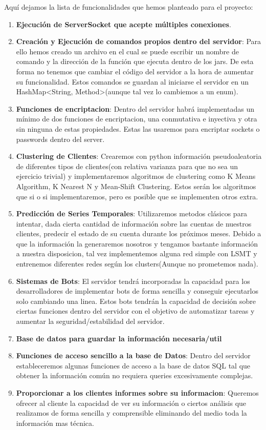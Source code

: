 \documentclass{article}
\theoremstyle{definition}
\begin{document}
Aquí dejamos la lista de funcionalidades que hemos planteado para el proyecto:
\begin{enumerate}
\item \textbf{Ejecución de ServerSocket que acepte múltiples conexiones}.
\item \textbf{Creación y Ejecución de comandos propios dentro del servidor}: Para ello hemos creado un archivo en el cual se puede escribir un nombre de comando y la dirección de la función que ejecuta dentro de los jars. De esta forma no tenemos que cambiar el código del servidor a la hora de aumentar su funcionalidad. Estos comandos se guardan al iniciarse el servidor en un HashMap<String, Method>(aunque tal vez lo cambiemos a un enum).
\item \textbf{Funciones de encriptacion}: Dentro del servidor habrá implementadas un mínimo de dos funciones de encriptacion, una conmutativa e inyectiva y otra sin ninguna de estas propiedades. Estas las usaremos para encriptar sockets o passwords dentro del server.
\item \textbf{Clustering de Clientes}: Crearemos con python información pseudoaleatoria de diferentes tipos de clientes(con relativa varianza para que no sea un ejercicio trivial) y implementaremos algoritmos de clustering como K Means Algorithm, K Nearest N y Mean-Shift Clustering. Estos serán los algoritmos que si o si implementaremos, pero es posible que se implementen otros extra. 
\item \textbf{Predicción de Series Temporales}: Utilizaremos metodos clásicos para intentar, dada cierta cantidad de información sobre las cuentas de nuestros clientes, predecir el estado de su cuenta durante los próximos meses.  Debido a que la información la generaremos nosotros y tengamos bastante información a nuestra disposicion, tal vez implementemos alguna red simple con LSMT y entrenemos diferentes redes según los clusters(Aunque no prometemos nada).
\item \textbf{Sistemas de Bots}: El servidor tendrá incorporadas la capacidad para los desarrolladores de implementar bots de forma sencilla y conseguir ejecutarlos solo cambiando una linea. Estos bots tendrán la capacidad de decisión sobre ciertas funciones dentro del servidor con el objetivo de automatizar tareas y aumentar la seguridad/estabilidad del servidor.
\item \textbf{Base de datos para guardar la información necesaria/util}
\item \textbf{Funciones de acceso sencillo a la base de Datos}: Dentro del servidor estableceremos algunas funciones de acceso a la base de datos SQL tal que obtener la información común no requiera queries excesivamente complejas.
\item \textbf{Proporcionar a los clientes informes sobre su informacion}: Queremos ofrecer al cliente la capacidad de ver su información o ciertos análisis que realizamos de forma sencilla y comprensible eliminando del medio toda la información mas técnica.
\end{enumerate}
\end{document}
